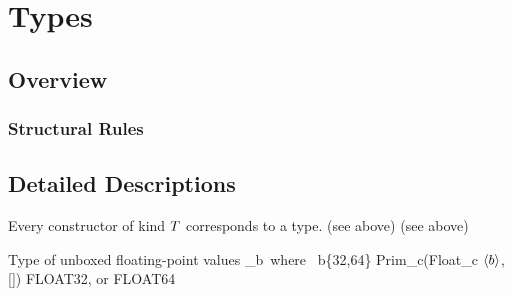 \documentclass[12pt,twoside,fleqn]{article}
\begin{document}
\section{Types}

\subsection{Overview}

\subsubsection{Structural Rules}

\irule
  {\validtype{\context}{\kind}}
  {\equivtype{\context}{\kind}{\kind}}

\irule
  {}
  {}

\irule
  {\qquad
   }
  {}

\subsection{Detailed Descriptions}

  {Every constructor of kind $T$ corresponds to a type.}
  {\constructor}
  {\textrm{(see above)}}
  {\textrm{(see above)}}
  {}
  {\irule
    {\validconstructor{\context}{\constructor}{\ktype}}
    {\validtype{\context}{\constructor}}
   \irule
    {}
    {}}

  {Type of unboxed floating-point values}
  {_b\quad\mbox{\ where\ } b\in\{32,64\}}
  {Prim\_c(Float\_c $\langle{b}\rangle$, [])}
  {FLOAT32, \mbox{or} FLOAT64}
  {}
  {\irule
    {\validcontext{\context}}
     {}}
\end{document}
